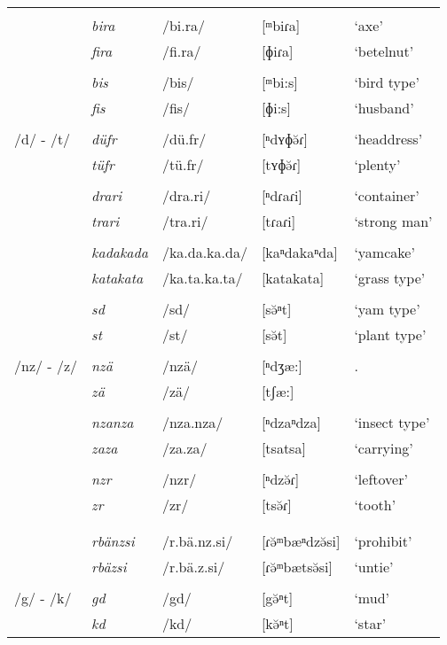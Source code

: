 \begin{longtable}{lllll}
		&&&&\\
		& \emph{bira} & /bi.ra/ & [ᵐbiɾa] & `axe'\\
		& \emph{fira} & /fi.ra/ & [ɸiɾa] & `betelnut'\\
		&&&&\\
		& \emph{bis} & /bis/ & [ᵐbi:s] & `bird type'\\
		& \emph{fis} & /fis/ & [ɸi:s] & `husband'\\
		&&&&\\
		/d/ - /t/ & \emph{düfr} & /dü.fr/ & [ⁿdʏɸə̆ɾ] & `headdress'\\
		& \emph{tüfr} & /tü.fr/ & [tʏɸə̆ɾ]& `plenty'\\
		&&&&\\
		& \emph{drari} & /dra.ri/ & [ⁿdɾaɾi] & `container'\\
		& \emph{trari} & /tra.ri/ & [tɾaɾi] & `strong man'\\
		&&&&\\
		& \emph{kadakada} & /ka.da.ka.da/ & [kaⁿdakaⁿda]&`yamcake'\\
		& \emph{katakata} & /ka.ta.ka.ta/ & [katakata]&`grass type'\\
		&&&&\\
		& \emph{sd} & /sd/ & [sə̆ⁿt]&`yam type'\\
		& \emph{st} & /st/ & [sə̆t]&`plant type'\\
		&&&&\\
		/nz/ - /z/ & \emph{nzä} & /nzä/ & [ⁿdʒæ:] & \Fsg.\Abs{}\\
		& \emph{zä} & /zä/ & [tʃæ:] & \Prox{}\\
		&&&&\\
		& \emph{nzanza} & /nza.nza/ & [ⁿdzaⁿdza] & `insect type'\\
		& \emph{zaza} & /za.za/ & [tsatsa] & `carrying'\\
		&&&&\\
		& \emph{nzr} & /nzr/ & [ⁿdzə̆ɾ] & `leftover'\\
		& \emph{zr} & /zr/ & [tsə̆ɾ] & `tooth'\\
		&&&&\\
		&&&&\\
		& \emph{rbänzsi} & /r.bä.nz.si/ & [ɾə̆ᵐbæⁿdzə̆si] & `prohibit'\\
		& \emph{rbäzsi} & /r.bä.z.si/ & [ɾə̆ᵐbætsə̆si] & `untie'\\
		&&&&\\
		/g/ - /k/ & \emph{gd} & /gd/ & [{\ᵑ}gə̆ⁿt]&`mud'\\
		& \emph{kd} & /kd/ & [kə̆ⁿt]&`star'\\

\end{longtable}
